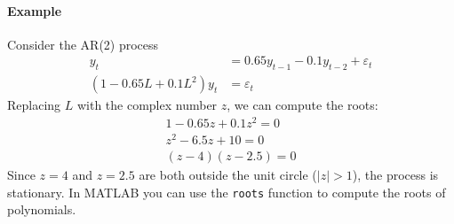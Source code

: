 \begin{enumerate}
\paragraph*{Example}
Consider the AR{(2)} process
\begin{align*}
y_{t} &= 0.65 y_{t-1} - 0.1 y_{t-2} + \varepsilon_{t}
\\
\left(1 - 0.65L + 0.1 L^2\right) y_{t} &= \varepsilon_{t}
\end{align*}
Replacing \(L\) with the complex number \(z\), we can compute the roots:
\begin{gather*}
1-0.65 z + 0.1 z^2 = 0
\\
z^2 - 6.5z + 10 = 0
\\
(z-4)(z-2.5)=0
\end{gather*}
Since \(z=4\) and \(z=2.5\) are both outside the unit circle (\(|z|>1\)),
  the process is stationary.
In MATLAB you can use the \texttt{roots} function to compute the roots of polynomials.
\end{enumerate}